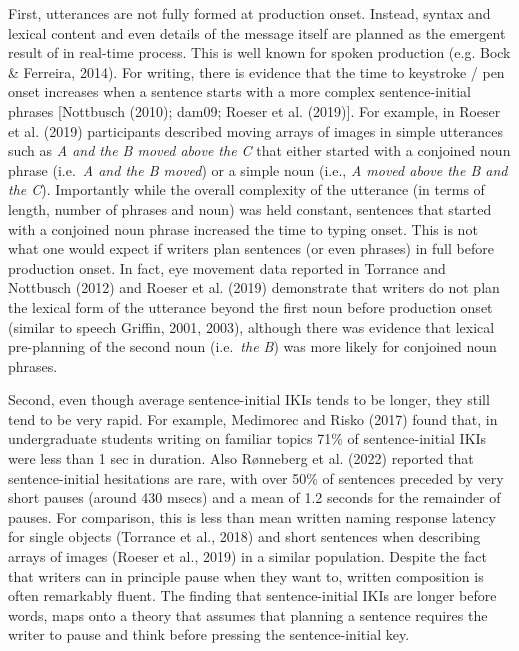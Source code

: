 \documentclass[
  man,floatsintext]{apa7}
\begin{document}
First, utterances are not fully formed at production onset. Instead, syntax and lexical content and even details of the message itself are planned as the emergent result of in real-time process. This is well known for spoken production (e.g. Bock \& Ferreira, 2014). For writing, there is evidence that the time to keystroke / pen onset increases when a sentence starts with a more complex sentence-initial phrases {[}Nottbusch (2010); dam09; Roeser et al. (2019){]}. For example, in Roeser et al. (2019) participants described moving arrays of images in simple utterances such as \emph{A and the B moved above the C} that either started with a conjoined noun phrase (i.e.~\emph{A and the B moved}) or a simple noun (i.e., \emph{A moved above the B and the C}). Importantly while the overall complexity of the utterance (in terms of length, number of phrases and noun) was held constant, sentences that started with a conjoined noun phrase increased the time to typing onset. This is not what one would expect if writers plan sentences (or even phrases) in full before production onset. In fact, eye movement data reported in Torrance and Nottbusch (2012) and Roeser et al. (2019) demonstrate that writers do not plan the lexical form of the utterance beyond the first noun before production onset (similar to speech Griffin, 2001, 2003), although there was evidence that lexical pre-planning of the second noun (i.e.~\emph{the B}) was more likely for conjoined noun phrases.

Second, even though average sentence-initial IKIs tends to be longer, they still tend to be very rapid. For example, Medimorec and Risko (2017) found that, in undergraduate students writing on familiar topics 71\% of sentence-initial IKIs were less than 1 sec in duration. Also Rønneberg et al. (2022) reported that sentence-initial hesitations are rare, with over 50\% of sentences preceded by very short pauses (around 430 msecs) and a mean of 1.2 seconds for the remainder of pauses. For comparison, this is less than mean written naming response latency for single objects (Torrance et al., 2018) and short sentences when describing arrays of images (Roeser et al., 2019) in a similar population. Despite the fact that writers can in principle pause when they want to, written composition is often remarkably fluent. The finding that sentence-initial IKIs are longer before words, maps onto a theory that assumes that planning a sentence requires the writer to pause and think before pressing the sentence-initial key.
\end{document}
